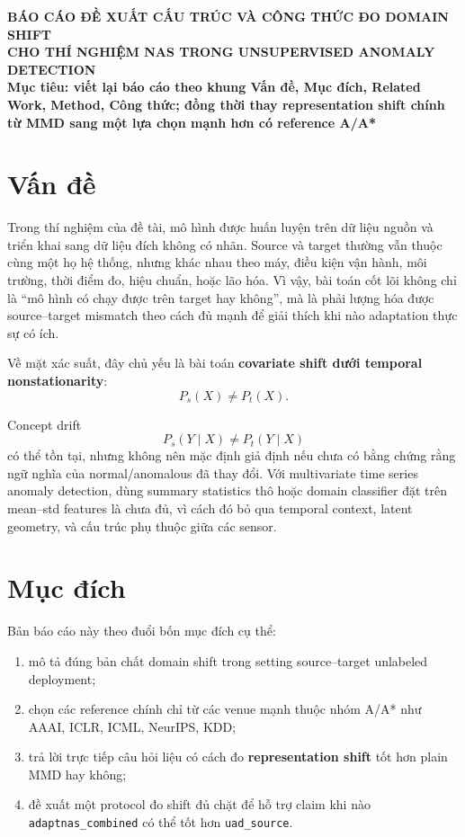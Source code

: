 \documentclass[a4paper]{article}
\begin{document}
\begin{center}
    \textbf{\Large BÁO CÁO ĐỀ XUẤT CẤU TRÚC VÀ CÔNG THỨC ĐO DOMAIN SHIFT}\\[0.2cm]
    \textbf{\Large CHO THÍ NGHIỆM NAS TRONG UNSUPERVISED ANOMALY DETECTION}\\[0.5cm]
    \textbf{Mục tiêu: viết lại báo cáo theo khung Vấn đề, Mục đích, Related Work, Method, Công thức; đồng thời thay representation shift chính từ MMD sang một lựa chọn mạnh hơn có reference A/A*}
\end{center}

\section{Vấn đề}

Trong thí nghiệm của đề tài, mô hình được huấn luyện trên dữ liệu nguồn và triển khai sang dữ liệu đích không có nhãn. Source và target thường vẫn thuộc cùng một họ hệ thống, nhưng khác nhau theo máy, điều kiện vận hành, môi trường, thời điểm đo, hiệu chuẩn, hoặc lão hóa. Vì vậy, bài toán cốt lõi không chỉ là ``mô hình có chạy được trên target hay không'', mà là phải lượng hóa được source--target mismatch theo cách đủ mạnh để giải thích khi nào adaptation thực sự có ích.

Về mặt xác suất, đây chủ yếu là bài toán \textbf{covariate shift dưới temporal nonstationarity}:
\[
P_s(X) \neq P_t(X).
\]

Concept drift
\[
P_s(Y \mid X) \neq P_t(Y \mid X)
\]
có thể tồn tại, nhưng không nên mặc định giả định nếu chưa có bằng chứng rằng ngữ nghĩa của normal/anomalous đã thay đổi. Với multivariate time series anomaly detection, dùng summary statistics thô hoặc domain classifier đặt trên mean--std features là chưa đủ, vì cách đó bỏ qua temporal context, latent geometry, và cấu trúc phụ thuộc giữa các sensor.

\section{Mục đích}

Bản báo cáo này theo đuổi bốn mục đích cụ thể:
\begin{enumerate}[label=\arabic*.]
    \item mô tả đúng bản chất domain shift trong setting source--target unlabeled deployment;
    \item chọn các reference chính chỉ từ các venue mạnh thuộc nhóm A/A* như AAAI, ICLR, ICML, NeurIPS, KDD;
    \item trả lời trực tiếp câu hỏi liệu có cách đo \textbf{representation shift} tốt hơn plain MMD hay không;
    \item đề xuất một protocol đo shift đủ chặt để hỗ trợ claim khi nào \texttt{adaptnas\_combined} có thể tốt hơn \texttt{uad\_source}.
\end{enumerate}
\end{document}
